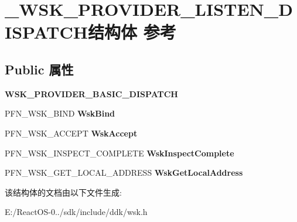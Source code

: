 \hypertarget{struct___w_s_k___p_r_o_v_i_d_e_r___l_i_s_t_e_n___d_i_s_p_a_t_c_h}{}\section{\+\_\+\+W\+S\+K\+\_\+\+P\+R\+O\+V\+I\+D\+E\+R\+\_\+\+L\+I\+S\+T\+E\+N\+\_\+\+D\+I\+S\+P\+A\+T\+C\+H结构体 参考}
\label{struct___w_s_k___p_r_o_v_i_d_e_r___l_i_s_t_e_n___d_i_s_p_a_t_c_h}
\subsection*{Public 属性}
\begin{DoxyCompactItemize}
\item 
\mbox{\label{struct___w_s_k___p_r_o_v_i_d_e_r___l_i_s_t_e_n___d_i_s_p_a_t_c_h_afe3fc34b64c482253697217af1643167}} 
{\bfseries W\+S\+K\+\_\+\+P\+R\+O\+V\+I\+D\+E\+R\+\_\+\+B\+A\+S\+I\+C\+\_\+\+D\+I\+S\+P\+A\+T\+CH}
\item 
\mbox{\label{struct___w_s_k___p_r_o_v_i_d_e_r___l_i_s_t_e_n___d_i_s_p_a_t_c_h_a3f4350ee982d39fee851fca98eb25631}} 
P\+F\+N\+\_\+\+W\+S\+K\+\_\+\+B\+I\+ND {\bfseries Wsk\+Bind}
\item 
\mbox{\label{struct___w_s_k___p_r_o_v_i_d_e_r___l_i_s_t_e_n___d_i_s_p_a_t_c_h_a75bbeadf79e1d58922c591caf9b197f3}} 
P\+F\+N\+\_\+\+W\+S\+K\+\_\+\+A\+C\+C\+E\+PT {\bfseries Wsk\+Accept}
\item 
\mbox{\label{struct___w_s_k___p_r_o_v_i_d_e_r___l_i_s_t_e_n___d_i_s_p_a_t_c_h_afe94b634c82976f78e9ed63a884de51a}} 
P\+F\+N\+\_\+\+W\+S\+K\+\_\+\+I\+N\+S\+P\+E\+C\+T\+\_\+\+C\+O\+M\+P\+L\+E\+TE {\bfseries Wsk\+Inspect\+Complete}
\item 
\mbox{\label{struct___w_s_k___p_r_o_v_i_d_e_r___l_i_s_t_e_n___d_i_s_p_a_t_c_h_af43e0a7bf3fae282a4c5546b0df1c405}} 
P\+F\+N\+\_\+\+W\+S\+K\+\_\+\+G\+E\+T\+\_\+\+L\+O\+C\+A\+L\+\_\+\+A\+D\+D\+R\+E\+SS {\bfseries Wsk\+Get\+Local\+Address}
\end{DoxyCompactItemize}


该结构体的文档由以下文件生成\+:\begin{DoxyCompactItemize}
\item 
E\+:/\+React\+O\+S-\/0../sdk/include/ddk/wsk.\+h\end{DoxyCompactItemize}
